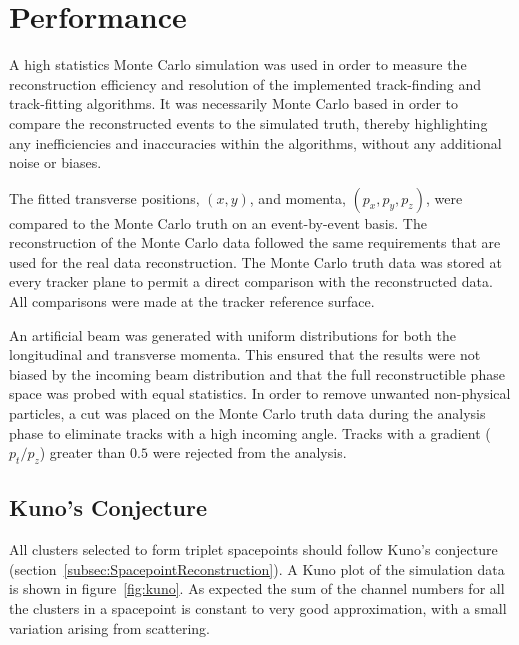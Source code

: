 \section{Performance}
\label{sec:Performance}

  A high statistics Monte Carlo simulation was used in order to measure the reconstruction efficiency and resolution of the implemented track-finding and track-fitting algorithms. It was necessarily Monte Carlo based in order to compare the reconstructed events to the simulated truth, thereby highlighting any inefficiencies and inaccuracies within the algorithms, without any additional noise or biases.

  The fitted transverse positions, $(x,y)$, and momenta, $(p_x, p_y, p_z)$, were compared to the Monte Carlo truth on an event-by-event basis. The reconstruction of the Monte Carlo data followed the same requirements that are used for the real data reconstruction. The Monte Carlo truth data was stored at every tracker plane to permit a direct comparison with the reconstructed data. All comparisons were made at the tracker reference surface. %

  An artificial beam was generated with uniform distributions for both the longitudinal and transverse momenta. This ensured that the results were not biased by the incoming beam distribution and that the full reconstructible phase space was probed with equal statistics. In order to remove unwanted non-physical particles, a cut was placed on the Monte Carlo truth data during the analysis phase to eliminate tracks with a high incoming angle. Tracks with a gradient ($p_t/p_z$) greater than $0.5$ were rejected from the analysis.
  
  \subsection{Kuno's Conjecture}
  \label{sec:performance:kunos_conjecture}
  All clusters selected to form triplet spacepoints should follow Kuno's conjecture (section~\ref{subsec:SpacepointReconstruction}). A Kuno plot of the simulation data is shown in figure~\ref{fig:kuno}. As expected the sum of the channel numbers for all the clusters in a spacepoint is constant to very good approximation, with a small variation arising from scattering.  
  
